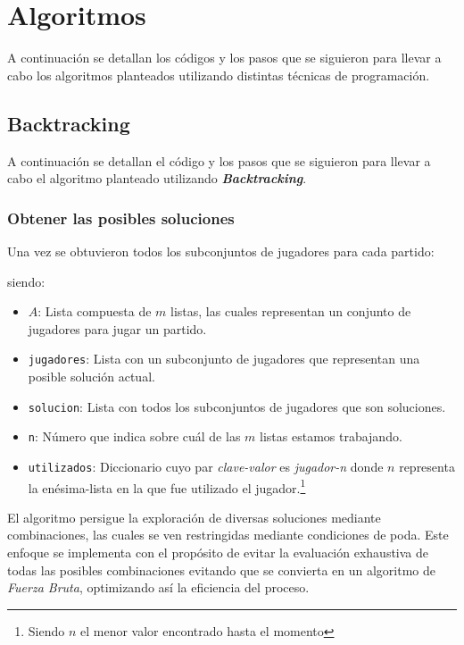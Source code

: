 \section{Algoritmos}

A continuación se detallan los códigos y los pasos que se siguieron para llevar a cabo los algoritmos planteados utilizando distintas técnicas de programación.

\subsection{Backtracking}

A continuación se detallan el código y los pasos que se siguieron para llevar a cabo el algoritmo planteado utilizando \textbf{\textit{Backtracking}}.

\subsubsection{Obtener las posibles soluciones}

Una vez se obtuvieron todos los subconjuntos de jugadores para cada partido:



siendo:
\begin{itemize}
    \item $A$: Lista compuesta de $m$ listas, las cuales representan un conjunto de jugadores para jugar un partido.
    \item \texttt{jugadores}: Lista con un subconjunto de jugadores que representan una posible solución actual.
    \item \texttt{solucion}: Lista con todos los subconjuntos de jugadores que son soluciones.
    \item \texttt{n}: Número que indica sobre cuál de las $m$ listas estamos trabajando.
    \item \texttt{utilizados}: Diccionario cuyo par \textit{clave-valor} es \textit{jugador-n} donde $n$ representa la enésima-lista en la que fue utilizado el jugador.\footnote{Siendo $n$ el menor valor encontrado hasta el momento}
\end{itemize}

El algoritmo persigue la exploración de diversas soluciones mediante combinaciones, las cuales se ven restringidas mediante condiciones de poda. Este enfoque se implementa con el propósito de evitar la evaluación exhaustiva de todas las posibles combinaciones evitando que se convierta en un algoritmo de \textit{Fuerza Bruta}, optimizando así la eficiencia del proceso.

